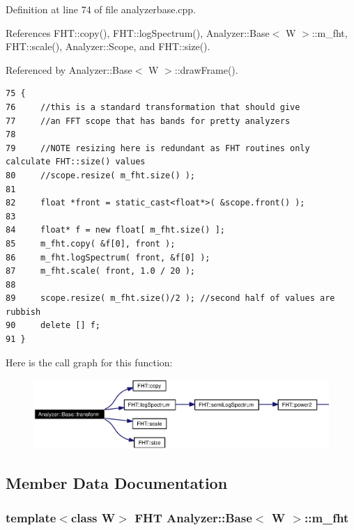 Definition at line 74 of file analyzerbase.cpp.

References FHT::copy(), FHT::log\-Spectrum(), Analyzer::Base$<$ W $>$::m\_\-fht, FHT::scale(), Analyzer::Scope, and FHT::size().

Referenced by Analyzer::Base$<$ W $>$::draw\-Frame().



\footnotesize\begin{verbatim}75 {
76     //this is a standard transformation that should give
77     //an FFT scope that has bands for pretty analyzers
78 
79     //NOTE resizing here is redundant as FHT routines only calculate FHT::size() values
80     //scope.resize( m_fht.size() );
81 
82     float *front = static_cast<float*>( &scope.front() );
83 
84     float* f = new float[ m_fht.size() ];
85     m_fht.copy( &f[0], front );
86     m_fht.logSpectrum( front, &f[0] );
87     m_fht.scale( front, 1.0 / 20 );
88 
89     scope.resize( m_fht.size()/2 ); //second half of values are rubbish
90     delete [] f;
91 }
\end{verbatim}\normalsize 


Here is the call graph for this function:\begin{figure}[H]
\begin{center}
\leavevmode
\includegraphics[width=349pt]{classAnalyzer_1_1Base_Analyzer_1_1Baseb2_cgraph}
\end{center}
\end{figure}


\subsection{Member Data Documentation}
\subsubsection{\setlength{\rightskip}{0pt plus 5cm}template$<$class W$>$ {\bf FHT} {\bf Analyzer::Base}$<$ W $>$::{\bf m\_\-fht}\hspace{0.3cm}{\tt  [protected]}}\label{classAnalyzer_1_1Base_Analyzer_1_1Basep3}




